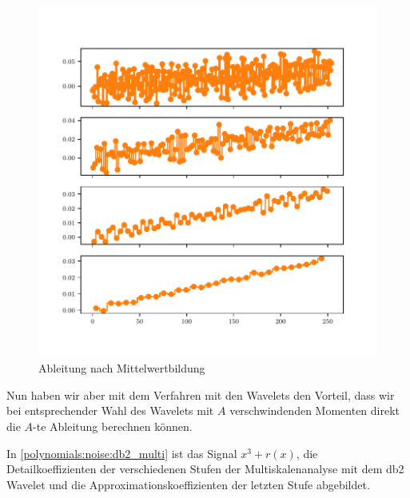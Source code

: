 \begin{refsection}
\begin{figure}
    \centering
    \includegraphics{papers/polynomials/images/polynomials_noise_moving_average.pdf}
    \caption{Ableitung nach Mittelwertbildung\label{polynomials:noise:average}}
\end{figure}

Nun haben wir aber mit dem Verfahren mit den Wavelets den Vorteil, dass wir bei
entsprechender Wahl des Wavelets mit $A$ verschwindenden Momenten direkt die
$A$-te Ableitung berechnen können.

In \cref{polynomials:noise:db2_multi} ist das Signal $x^3 + r(x)$, die
Detailkoeffizienten der verschiedenen Stufen der Multiskalenanalyse mit dem db2
Wavelet und die Approximationskoeffizienten der letzten Stufe abgebildet.


\end{refsection}
